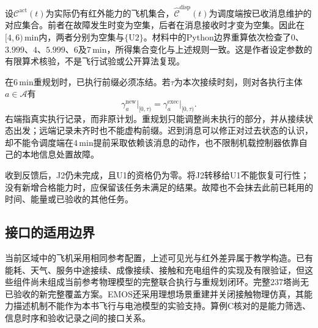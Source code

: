 设$\mathcal C^{\mathrm{act}}(t)$为实际仍有红外能力的飞机集合，$\widehat{\mathcal C}^{\mathrm{disp}}(t)$为调度端按已收消息维护的对应集合。前者在故障发生时变为空集，后者在消息接收时才变为空集。因此在$[4,6)\,\mathrm{min}$内，两者分别为空集与$\{\mathrm{U2}\}$。材料中的Python边界重算依次检查了$0$、$3.999$、$4$、$5.999$、$6$及$7\,\mathrm{min}$，所得集合变化与上述规则一致。这是作者设定参数的有限算术核验，不是飞行试验或公开算法复现。

在$6\,\mathrm{min}$重规划时，已执行前缀必须冻结。若$\tau$为本次接续时刻，则对各执行主体$a\in\mathcal A$有
\begin{equation}
\gamma_a^{\mathrm{new}}\big|_{[0,\tau)}
=\gamma_a^{\mathrm{exec}}\big|_{[0,\tau)}.
\label{s0409:frozen_prefix}
\end{equation}
右端指真实执行记录，而非原计划。重规划只能调整尚未执行的部分，并从接续状态出发；远端记录未齐时也不能虚构前缀。迟到消息可以修正对过去状态的认识，却不能令调度端在$4\,\mathrm{min}$提前采取依赖该消息的动作，也不限制机载控制器依靠自己的本地信息处置故障。

收到反馈后，J2仍未完成，且U1的资格仍为零。将J2转移给U1不能恢复可行性；没有新增合格能力时，应保留该任务未满足的结果。故障也不会抹去此前已耗用的时间、能量或已验收的其他任务。

\subsection{接口的适用边界}

当前区域中的飞机采用相同参考配置，上述可见光与红外差异属于教学构造。已有能耗、天气、服务中途接续、成像接续、接触和充电组件的实现及有限验证，但这些组件尚未组成当前参考物理模型的完整联合执行与重规划闭环。完整$237$塔尚无已验收的新完整覆盖方案。EMOS还采用理想场景重建并关闭接触物理仿真，其能力描述机制不能作为本书飞行与电池模型的实验支持\cite{EMOS2025}。算例C核对的是能力筛选、信息时序和验收记录之间的接口关系。
